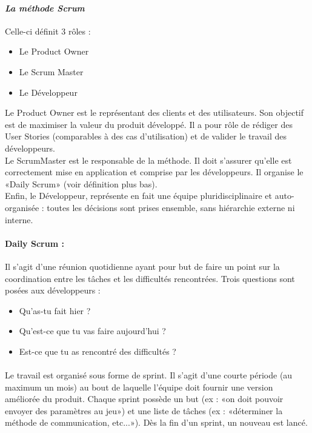 		\paragraph{\emph{La méthode Scrum}\\}
Celle-ci définit 3 rôles :
	\begin{itemize}
		\item Le Product Owner
		\item Le Scrum Master
		\item Le Développeur
	\end {itemize}
Le Product Owner est le représentant des clients et des utilisateurs. Son objectif est de maximiser la valeur du produit développé. Il a pour rôle de rédiger des User Stories (comparables à des cas d'utilisation) et de valider le travail des développeurs. 
\\Le ScrumMaster est le responsable de la méthode. Il doit s’assurer qu’elle est correctement mise en application et comprise par les développeurs. Il organise le «Daily Scrum» (voir définition plus bas).
\\Enfin, le Développeur, représente en fait une équipe pluridisciplinaire et auto-organisée : toutes les décisions sont prises ensemble, sans hiérarchie externe ni interne.
 
		\paragraph{Daily Scrum :}
Il s’agit d’une réunion quotidienne ayant pour but de faire un point sur la coordination entre les tâches et les difficultés rencontrées.  Trois questions sont posées aux développeurs : 
	\begin{itemize}
		\item Qu’as-tu fait hier ?
		\item Qu’est-ce que tu vas faire aujourd’hui ?
		\item Est-ce que tu as rencontré des difficultés ?
	\end {itemize}
	
\paragraph{}Le travail est organisé sous forme de sprint. Il s’agit d’une courte période (au maximum un mois) au bout de laquelle l’équipe doit fournir une version améliorée du produit. Chaque sprint possède un but (ex : «on doit pouvoir envoyer des paramètres au jeu») et une liste de tâches (ex : «déterminer la méthode de communication, etc...»). Dès la fin d’un sprint, un nouveau est lancé.

